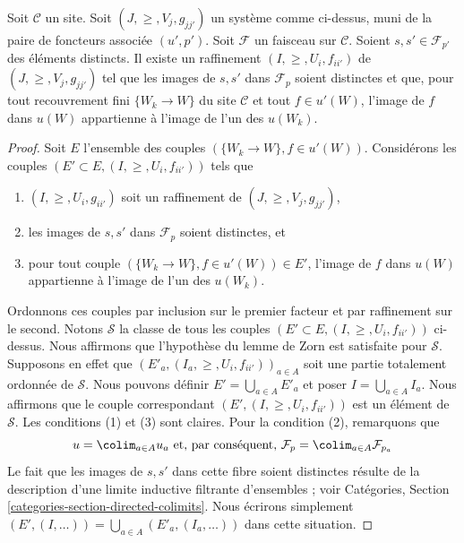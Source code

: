 \begin{lemma}
\label{lemma-refine-all-at-once}
Soit $\mathcal{C}$ un site.
Soit $(J, \geq, V_j, g_{jj'})$ un système comme ci-dessus, muni de la
paire de foncteurs associée $(u', p')$.
Soit $\mathcal{F}$ un faisceau sur $\mathcal{C}$.
Soient $s, s' \in \mathcal{F}_{p'}$ des éléments distincts.
Il existe un raffinement $(I, \geq, U_i, f_{ii'})$
de $(J, \geq, V_j, g_{jj'})$ tel que les images de $s, s'$ dans
$\mathcal{F}_p$ soient distinctes et que,
pour tout recouvrement fini $\{W_k \to W\}$ du site
$\mathcal{C}$ et tout $f \in u'(W)$, l’image de $f$ dans $u(W)$
appartienne à l’image de l’un des $u(W_k)$.
\end{lemma}

\begin{proof}
Soit $E$ l’ensemble des couples $(\{W_k \to W\}, f\in u'(W))$.
Considérons les couples $(E' \subset E, (I, \geq, U_i, f_{ii'}))$
tels que
\begin{enumerate}
\item $(I, \geq, U_i, g_{ii'})$ soit un raffinement de $(J, \geq, V_j, g_{jj'})$,
\item les images de $s, s'$ dans $\mathcal{F}_p$ soient distinctes, et
\item pour tout couple $(\{W_k \to W\}, f\in u'(W)) \in E'$, l’image de
$f$ dans $u(W)$ appartienne à l’image de l’un des $u(W_k)$.
\end{enumerate}
Ordonnons ces couples par inclusion sur le premier facteur et
par raffinement sur le second. Notons $\mathcal{S}$ la classe
de tous les couples $(E' \subset E, (I, \geq, U_i, f_{ii'}))$ ci-dessus.
Nous affirmons que l’hypothèse du lemme de Zorn est satisfaite pour $\mathcal{S}$.
Supposons en effet que $(E'_a, (I_a, \geq, U_i, f_{ii'}))_{a \in A}$
soit une partie totalement ordonnée de $\mathcal{S}$. Nous pouvons définir
$E' = \bigcup_{a \in A} E'_a$ et poser $I = \bigcup_{a \in A} I_a$.
Nous affirmons que le couple correspondant
$(E' , (I, \geq, U_i, f_{ii'}))$ est un élément de $\mathcal{S}$.
Les conditions (1) et (3) sont claires. Pour la condition (2), remarquons
que
$$
u = \colim_{a \in A} u_a
\text{ et, par conséquent, }
\mathcal{F}_p = \colim_{a \in A} \mathcal{F}_{p_a}
$$
Le fait que les images de $s, s'$ dans cette fibre soient distinctes résulte
de la description d’une limite inductive filtrante d’ensembles ; voir
Catégories, Section \ref{categories-section-directed-colimits}.
Nous écrirons simplement
$(E', (I, \ldots)) = \bigcup_{a \in A}(E'_a, (I_a, \ldots))$
dans cette situation.


\end{proof}
